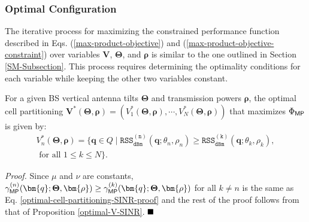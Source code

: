 \subsubsection{Optimal Configuration}\label{MP-Optimal-Configuration}

The iterative process for maximizing the constrained performance function described in Eqs. (\ref{max-product-objective}) and (\ref{max-product-objective-constraint}) over variables $\bm{V}$, $\bm{\Theta}$, and $\bm{\rho}$ is similar to the one outlined in Section \ref{SM-Subsection}. This process requires determining the optimality conditions for each variable while keeping the other two variables constant.

\begin{Proposition}\label{MP-optimal-cell}
For a given BS vertical antenna tilts $\bm{\Theta}$ and transmission powers $\bm{\rho}$, the optimal cell partitioning $\bm{V}^*(\bm{\Theta}, \bm{\rho}) = \left(V^*_1(\bm{\Theta}, \bm{\rho}), \cdots, V_N^*(\bm{\Theta}, \bm{\rho})\right)$ that maximizes $\Phi_{{\sf MP}}$ is given by:
\begin{multline}\label{optimal-cell-partitioning-MP}
    \!\!\!\!\! V_n^*(\bm{\Theta}, \bm{\rho}) = \big\{\bm{q} \in Q \mid \mathtt{RSS_{dBm}^{(n)}}(\bm{q}; \theta_n, \rho_n) \geq \mathtt{RSS_{dBm}^{(k)}}(\bm{q}; \theta_k, \rho_k), \\ \textrm{ for all } 1 \leq k \leq N \big\}.
\end{multline}        
\end{Proposition}
\textit{Proof. }
Since $\mu$ and $\nu$ are constants, $\gamma_{\sf MP}^{(n)}(\bm{q}; \mathbf{\Theta}, \bm{\rho}) \geq \gamma_{\sf MP}^{(k)}(\bm{q}; \mathbf{\Theta}, \bm{\rho})$ for all $k \neq n$ is the same as Eq. \eqref{optimal-cell-partitioning-SINR-proof} and the rest of the proof follows from that of Proposition \ref{optimal-V-SINR}. $\hfill\blacksquare$ 


